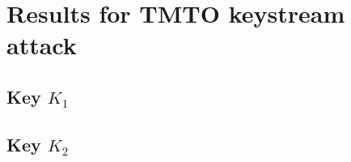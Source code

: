 
\chapter{Results for TMTO keystream attack}
\label{appendix:tmto-keystream-results}
\section{Key $K_1$}

%

\section{Key $K_2$}

%


